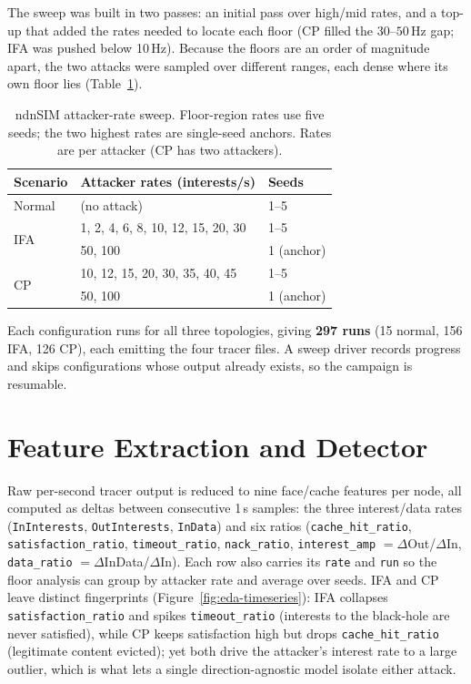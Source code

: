 \documentclass[11pt,a4paper]{article}
\begin{document}
The sweep was built in two passes: an initial pass over high/mid rates, and a top-up that added the rates needed to locate each floor (CP filled the $30$--$50$\,Hz gap; IFA was pushed below 10\,Hz). Because the floors are an order of magnitude apart, the two attacks were sampled over different ranges, each dense where its own floor lies (Table~\ref{tab:sweep-matrix}).

\begin{table}[H]
\centering
\caption{ndnSIM attacker-rate sweep. Floor-region rates use five seeds; the two highest rates are single-seed anchors. Rates are per attacker (CP has two attackers).}
\label{tab:sweep-matrix}
\begin{tabular}{lll}
\toprule
\textbf{Scenario} & \textbf{Attacker rates (interests/s)} & \textbf{Seeds} \\
\midrule
Normal & (no attack) & 1--5 \\
\midrule
\multirow{2}{*}{IFA}
  & 1, 2, 4, 6, 8, 10, 12, 15, 20, 30 & 1--5 \\
  & 50, 100 & 1 (anchor) \\
\midrule
\multirow{2}{*}{CP}
  & 10, 12, 15, 20, 30, 35, 40, 45 & 1--5 \\
  & 50, 100 & 1 (anchor) \\
\bottomrule
\end{tabular}
\end{table}

Each configuration runs for all three topologies, giving \textbf{297 runs} (15 normal, 156 IFA, 126 CP), each emitting the four tracer files. A sweep driver records progress and skips configurations whose output already exists, so the campaign is resumable.

\section{Feature Extraction and Detector}
\label{sec:ndnsim-method}

Raw per-second tracer output is reduced to nine face/cache features per node, all computed as deltas between consecutive 1\,s samples: the three interest/data rates (\texttt{InInterests}, \texttt{OutInterests}, \texttt{InData}) and six ratios (\texttt{cache\_hit\_ratio}, \texttt{satisfaction\_ratio}, \texttt{timeout\_ratio}, \texttt{nack\_ratio}, \texttt{interest\_amp} $=\Delta$Out/$\Delta$In, \texttt{data\_ratio} $=\Delta$InData/$\Delta$In). Each row also carries its \texttt{rate} and \texttt{run} so the floor analysis can group by attacker rate and average over seeds. IFA and CP leave distinct fingerprints (Figure~\ref{fig:eda-timeseries}): IFA collapses \texttt{satisfaction\_ratio} and spikes \texttt{timeout\_ratio} (interests to the black-hole are never satisfied), while CP keeps satisfaction high but drops \texttt{cache\_hit\_ratio} (legitimate content evicted); yet both drive the attacker's interest rate to a large outlier, which is what lets a single direction-agnostic model isolate either attack.
\end{document}
